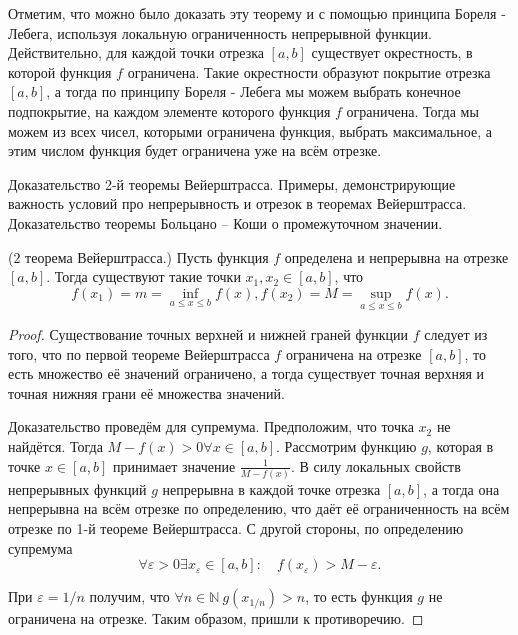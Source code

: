 Отметим, что можно было доказать эту теорему и с помощью принципа Бореля - Лебега, используя локальную ограниченность непрерывной функции. Действительно, для каждой точки отрезка $[a, b]$ существует окрестность, в которой функция $f$ ограничена. Такие окрестности образуют покрытие отрезка $[a, b]$, а тогда по принципу Бореля - Лебега мы можем выбрать конечное подпокрытие, на каждом элементе которого функция $f$ ограничена. Тогда мы можем из всех чисел, которыми ограничена функция, выбрать максимальное, а этим числом функция будет ограничена уже на всём отрезке.

\newpage
\begin{problem}
Доказательство 2-й теоремы Вейерштрасса. Примеры, демонстрирующие важность условий про непрерывность и отрезок в теоремах Вейерштрасса. Доказательство теоремы
Больцано – Коши о промежуточном значении.
\end{problem}
\begin{theorem}
    (2 теорема Вейерштрасса.) Пусть функция $f$ определена и непрерывна
    на отрезке $[a, b]$. Тогда существуют такие точки $x_1, x_2 \in[a, b]$, что
    $$
        f\left(x_1\right)=m=\inf _{a \leq x \leq b} f(x), f\left(x_2\right)=M=\sup _{a \leq x \leq b} f(x) .
    $$
\end{theorem}

\begin{proof}
    Существование точных верхней и нижней граней функции $f$ следует из того, что по первой теореме Вейерштрасса $f$ ограничена на отрезке $[a, b]$, то есть множество её значений ограничено, а тогда существует точная верхняя и точная нижняя грани её множества значений.

    Доказательство проведём для супремума. Предположим, что точка $x_2$ не найдётся. Тогда $M-f(x)>0 \forall x \in[a, b]$. Рассмотрим функцию $g$, которая в точке $x \in[a, b]$ принимает значение $\frac{1}{M-f(x)}$. В силу локальных свойств непрерывных функций $g$ непрерывна в каждой точке отрезка $[a, b]$, а тогда она непрерывна на всём отрезке по определению, что даёт её ограниченность на всём отрезке по 1-й теореме Вейерштрасса. С другой стороны, по определению супремума
    $$
        \forall \varepsilon>0 \exists x_{\varepsilon} \in[a, b]: \quad f\left(x_{\varepsilon}\right)>M-\varepsilon .
    $$

    При $\varepsilon=1 / n$ получим, что $\forall n \in \mathbb{N} \: g\left(x_{1 / n}\right)>n$, то есть функция $g$ не ограничена на отрезке. Таким образом, пришли к противоречию.
\end{proof}


